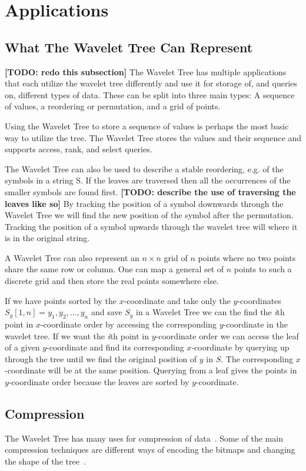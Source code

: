 \section{Applications}
\subsection{What The Wavelet Tree Can Represent}
\textbf{[TODO: redo this subsection]}
The Wavelet Tree has multiple applications that each utilize the wavelet tree differently and use it for storage of, and queries on, different types of data.
These can be split into three main types: A sequence of values, a reordering or permutation, and a grid of points.

Using the Wavelet Tree to store a sequence of values is perhaps the most basic way to utilize the tree.
The Wavelet Tree stores the values and their sequence and supports access, rank, and select queries.

The Wavelet Tree can also be used to describe a stable reordering, e.g. of the symbols in a string S. 
If the leaves are traversed then all the occurrences of the smaller symbols are found first. \textbf{[TODO: describe the use of traversing the leaves like so]}
By tracking the position of a symbol downwards through the Wavelet Tree we will find the new position of the symbol after the permutation.
Tracking the position of a symbol upwards through the wavelet tree will where it is in the original string. 

A Wavelet Tree can also represent an $n \times n$ grid of $n$ points where no two points share the same row or column. 
One can map a general set of $n$ points to such a discrete grid and then store the real points somewhere else.

If we have points sorted by the $x$-coordinate and take only the $y$-coordinates $S_y[1,n] = y_1,y_2,...,y_n$ and save $S_y$ in a Wavelet Tree we can the find the \textit{i}th point in $x$-coordinate order by accessing the corresponding $y$-coordinate in the wavelet tree. 
If we want the \textit{i}th point in $y$-coordinate order we can access the leaf of a given $y$-coordinate and find its corresponding $x$-coordinate by querying up through the tree until we find the original position of $y$ in $S$. 
The corresponding $x$-coordinate will be at the same position.
Querying from a leaf gives the points in $y$-coordinate order because the leaves are sorted by $y$-coordinate.

\subsection{Compression}
The Wavelet Tree has many uses for compression of data~.
Some of the main compression techniques are different ways of encoding the bitmaps and changing the shape of the tree~.

